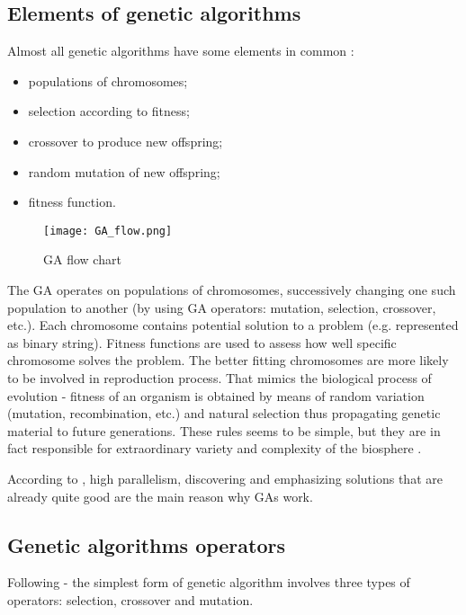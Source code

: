 \subsection{Elements of genetic algorithms}

Almost all genetic algorithms have some elements in common \cite{Mitchell01}:
\begin{itemize}
  \item populations of chromosomes;
  \item selection according to fitness;
  \item crossover to produce new offspring;
  \item random mutation of new offspring;
  \item fitness function.
\end{itemize}

\begin{figure}[ht]
  \begin{center}
    \texttt{[image: GA\_flow.png]}
  \end{center}
  \caption{GA flow chart \cite{Haupt:2004:PGA:1007746}}
\end{figure}

The GA operates on populations of chromosomes, successively changing one such population to another (by using GA operators: mutation, selection, crossover, etc.). 
Each chromosome contains potential solution to a problem (e.g. represented as binary string). 
Fitness functions are used to assess how well specific chromosome solves the problem.
The better fitting chromosomes are more likely to be involved in reproduction process.
That mimics the biological process of evolution - fitness of an organism is obtained by means of random variation (mutation, recombination, etc.) and natural selection
thus propagating genetic material to future generations.
These rules seems to be simple, but they are in fact responsible for extraordinary variety and complexity of the biosphere 
\cite{Mitchell01}. 
 
According to \cite{Mitchell01} , high parallelism, discovering and emphasizing solutions that are already quite good are the main reason why GAs work.  
 

\subsection{Genetic algorithms operators}

Following \cite{Mitchell01} - the simplest form of genetic algorithm involves three types of operators: selection, crossover and mutation. 

